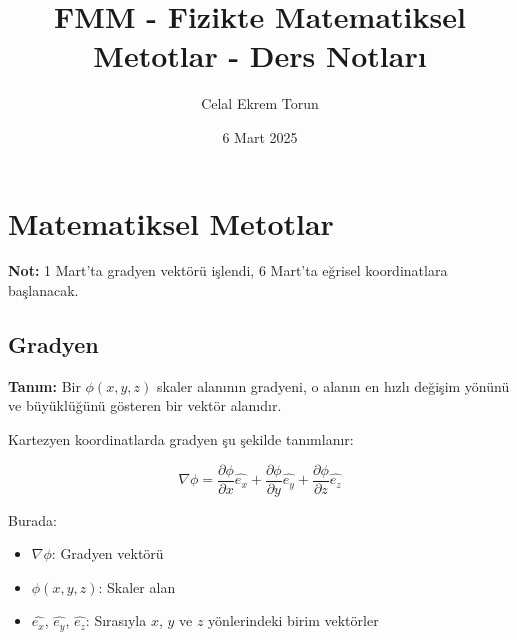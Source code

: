 \documentclass[11pt,letterpaper,twocolumn]{fenbil}
\title{FMM - Fizikte Matematiksel Metotlar - Ders Notları}
\author{Celal Ekrem Torun}
\date{6 Mart 2025}
\begin{document}

\section{Matematiksel Metotlar}

\textbf{Not:} 1 Mart'ta gradyen vektörü işlendi, 6 Mart'ta eğrisel koordinatlara başlanacak.

\subsection{Gradyen}

\textbf{Tanım:} Bir $\phi(x, y, z)$ skaler alanının gradyeni, o alanın en hızlı değişim yönünü ve büyüklüğünü gösteren bir vektör alanıdır.

Kartezyen koordinatlarda gradyen şu şekilde tanımlanır:

\[
\nabla \phi = \frac{\partial \phi}{\partial x} \hat{e_x} + \frac{\partial \phi}{\partial y} \hat{e_y} + \frac{\partial \phi}{\partial z} \hat{e_z}
\]

Burada:

\begin{itemize}
    \item $\nabla \phi$: Gradyen vektörü
    \item $\phi(x, y, z)$: Skaler alan
    \item $\hat{e_x}$, $\hat{e_y}$, $\hat{e_z}$: Sırasıyla $x$, $y$ ve $z$ yönlerindeki birim vektörler
\end{itemize}
\end{document}
